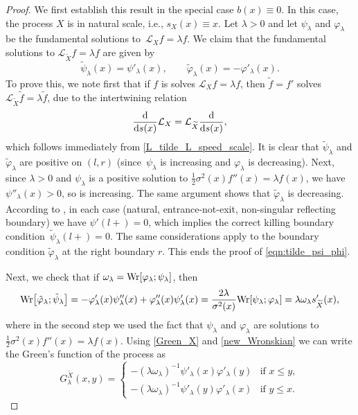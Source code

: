 \documentclass[pdftex]{sigma}
\numberwithin{equation}{section}
\theoremstyle{definition}
\def\L{{\mathcal L}}
\def\wr{{\textnormal{Wr}}}
\def\d{{\textnormal d}}
\begin{document}
\begin{proof}
We first establish this result in the special case $b(x) \equiv 0$. In this case, the process $X$ is in natural scale, i.e., $s_X(x) \equiv x$. Let $\lambda>0$ and let $\psi_{\lambda}$ and $\varphi_{\lambda}$ be the fundamental solutions to~${\L_X f=\lambda f}$. We claim that the fundamental solutions to $\L_{\widetilde X} f= \lambda f$ are given by
\begin{equation}\label{eqn:tilde_psi_phi}
\tilde \psi_{\lambda}(x)=\psi'_{\lambda}(x), \qquad
\tilde \varphi_{\lambda}(x)=-\varphi'_{\lambda}(x).
\end{equation}
To prove this, we note first that if $f$ is solves $\L_X f=\lambda f$, then $\tilde f=f'$ solves $\L_{\widetilde X} \tilde f=\lambda \tilde f$, due to the intertwining relation
\[
\frac{\d}{\d s(x)} \L_X = \L_{\widetilde X}  \frac{\d}{\d s(x)},
\]
which follows immediately from \eqref{L_tilde_L_speed_scale}.
 It is clear that $\tilde \psi_{\lambda}$ and $\tilde \varphi_{\lambda}$ are positive on $(l,r)$ (since~$\psi_{\lambda}$ is increasing
and $\varphi_{\lambda}$ is decreasing). Next, since $\lambda>0$ and $\psi_{\lambda}$ is a positive solution to $\tfrac{1}{2} \sigma^2(x) f''(x)=\lambda f(x)$, we have $\psi''_{\lambda}(x)>0$, so  is increasing. The same argument shows that $\tilde \varphi_{\lambda}$ is decreasing. According to
\cite[Section II.10]{Borodin2002}, in each case (natural, entrance-not-exit, non-singular reflecting boundary) we have
$\psi'(l+)=0$, which implies the correct killing boundary condition~${\tilde \psi_{\lambda}(l+)=0}$. The same considerations apply to the boundary condition $\tilde \varphi_{\lambda}$ at the right boundary $r$. This ends the proof of \eqref{eqn:tilde_psi_phi}.



Next, we check that if $\omega_{\lambda}=\wr[\varphi_{\lambda}; \psi_{\lambda}]$, then
\begin{equation}\label{new_Wronskian}
\wr\big[\tilde \varphi_{\lambda}; \tilde \psi_{\lambda}\big]=
-\varphi'_{\lambda}(x) \psi''_{\lambda}(x)+\varphi''_{\lambda}(x)\psi'_{\lambda}(x)
=\frac{2\lambda}{\sigma^2(x)} \wr[\psi_{\lambda}; \varphi_{\lambda}]=\lambda \omega_{\lambda} s_{\widetilde X}'(x),
\end{equation}
where in the second step we used the fact that $\psi_{\lambda}$ and $\varphi_{\lambda}$ are solutions to $\tfrac{1}{2} \sigma^2(x) f''(x)=\lambda f(x)$.
Using \eqref{Green_X} and \eqref{new_Wronskian} we can write the Green's function of the process  as
\begin{equation}\label{Green_tilde_X}
 G^{\widetilde X}_{\lambda}(x,y)=
 \begin{cases}
 -(\lambda \omega_{\lambda})^{-1} \psi'_{\lambda}(x) \varphi'_{\lambda}(y)  & {\text{if }} x\le y, \\
 -(\lambda \omega_{\lambda})^{-1} \psi'_{\lambda}(y) \varphi'_{\lambda}(x)  & {\text{if }} y\le x.
 \end{cases}
\end{equation}


\end{proof}
\end{document}
